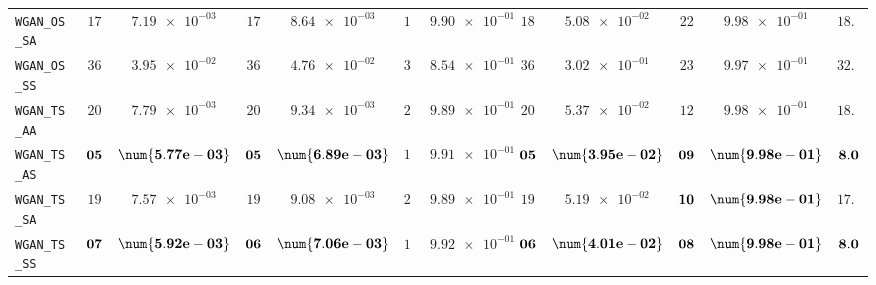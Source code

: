 \begin{xltabular}{\textwidth}{l||cC|cC|cC|cC|cC||c}
	\texttt{WGAN\_OS\_SA} & $ 17$ & $ \num{7.19e-03}$ & $ 17$ & $ \num{8.64e-03}$ & $ 19$ & $ \num{9.90e-01}$ & $ 18$ & $ \num{5.08e-02}$ & $ 22$ & $ \num{9.98e-01}$ & $ 18.6$  \\
	\texttt{WGAN\_OS\_SS} & $ 36$ & $ \num{3.95e-02}$ & $ 36$ & $ \num{4.76e-02}$ & $ 32$ & $ \num{8.54e-01}$ & $ 36$ & $ \num{3.02e-01}$ & $ 23$ & $ \num{9.97e-01}$ & $ 32.6$  \\
	\texttt{WGAN\_TS\_AA} & $ 20$ & $ \num{7.79e-03}$ & $ 20$ & $ \num{9.34e-03}$ & $ 21$ & $ \num{9.89e-01}$ & $ 20$ & $ \num{5.37e-02}$ & $ 12$ & $ \num{9.98e-01}$ & $ 18.6$  \\
	\texttt{WGAN\_TS\_AS} & $\bf 05$ & $\bf \num{5.77e-03}$ & $\bf 05$ & $\bf \num{6.89e-03}$ & $ 16$ & $ \num{9.91e-01}$ & $\bf 05$ & $\bf \num{3.95e-02}$ & $\bf 09$ & $\bf \num{9.98e-01}$ & $\bf 8.0$  \\
	\texttt{WGAN\_TS\_SA} & $ 19$ & $ \num{7.57e-03}$ & $ 19$ & $ \num{9.08e-03}$ & $ 22$ & $ \num{9.89e-01}$ & $ 19$ & $ \num{5.19e-02}$ & $\bf 10$ & $\bf \num{9.98e-01}$ & $ 17.8$  \\
	\texttt{WGAN\_TS\_SS} & $\bf 07$ & $\bf \num{5.92e-03}$ & $\bf 06$ & $\bf \num{7.06e-03}$ & $ 13$ & $ \num{9.92e-01}$ & $\bf 06$ & $\bf \num{4.01e-02}$ & $\bf 08$ & $\bf \num{9.98e-01}$ & $\bf 8.0$  \\ \midrule

\end{xltabular}
